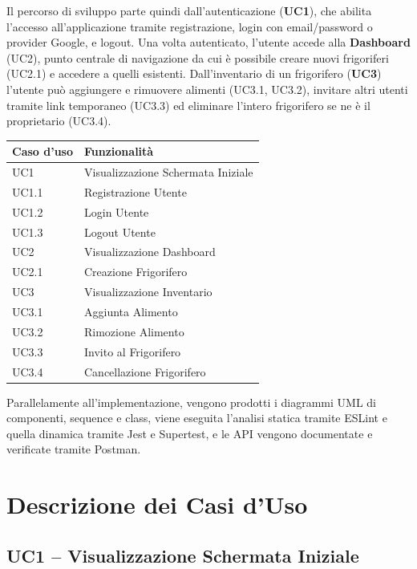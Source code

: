 \documentclass[12pt,a4paper,twoside]{report}
\begin{document}
Il percorso di sviluppo parte quindi dall'autenticazione (\textbf{UC1}), che abilita l'accesso all'applicazione tramite registrazione, login con email/password o provider Google, e logout. Una volta autenticato, l'utente accede alla \textbf{Dashboard} (UC2), punto centrale di navigazione da cui è possibile creare nuovi frigoriferi (UC2.1) e accedere a quelli esistenti. Dall'inventario di un frigorifero (\textbf{UC3}) l'utente può aggiungere e rimuovere alimenti (UC3.1, UC3.2), invitare altri utenti tramite link temporaneo (UC3.3) ed eliminare l'intero frigorifero se ne è il proprietario (UC3.4).

\begin{center}
\begin{tabular}{@{} l l @{}}
  \toprule
  \textbf{Caso d'uso} & \textbf{Funzionalità} \\
  \midrule
  UC1    & Visualizzazione Schermata Iniziale \\
  UC1.1  & Registrazione Utente \\
  UC1.2  & Login Utente \\
  UC1.3  & Logout Utente \\
  UC2    & Visualizzazione Dashboard \\
  UC2.1  & Creazione Frigorifero \\
  UC3    & Visualizzazione Inventario \\
  UC3.1  & Aggiunta Alimento \\
  UC3.2  & Rimozione Alimento \\
  UC3.3  & Invito al Frigorifero \\
  UC3.4  & Cancellazione Frigorifero \\
  \bottomrule
\end{tabular}
\end{center}

Parallelamente all'implementazione, vengono prodotti i diagrammi UML di componenti, sequence e class, viene eseguita l'analisi statica tramite ESLint e quella dinamica tramite Jest e Supertest, e le API vengono documentate e verificate tramite Postman.

\section{Descrizione dei Casi d'Uso}

\subsection{UC1 -- Visualizzazione Schermata Iniziale}
\end{document}
